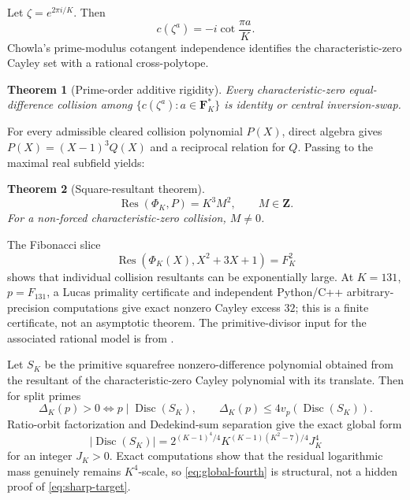 \documentclass[11pt]{article}
\newtheorem{theorem}{Theorem}[section]
\newcommand{\Z}{\mathbf Z}
\newcommand{\Res}{\operatorname{Res}}
\newcommand{\Disc}{\operatorname{Disc}}
\begin{document}
Let $\zeta=e^{2\pi i/K}$.  Then
\[
c(\zeta^a)=-i\cot\frac{\pi a}{K}.
\]
Chowla's prime-modulus cotangent independence \cite{Chowla1970,Wang1982}
identifies the characteristic-zero Cayley set with a rational cross-polytope.

\begin{theorem}[Prime-order additive rigidity]\label{thm:add-rigidity}
Every characteristic-zero equal-difference collision among
$\{c(\zeta^a):a\in\mathbf F_K^*\}$ is identity or central inversion-swap.
\end{theorem}

For every admissible cleared collision polynomial $P(X)$, direct algebra gives
$P(X)=(X-1)^3Q(X)$ and a reciprocal relation for $Q$.  Passing to the maximal
real subfield yields:

\begin{theorem}[Square-resultant theorem]\label{thm:square-res}
\begin{equation}\label{eq:square-res}
\Res(\Phi_K,P)=K^3M^2,\qquad M\in\Z.
\end{equation}
For a non-forced characteristic-zero collision, $M\ne0$.
\end{theorem}

The Fibonacci slice
\[
\Res(\Phi_K(X),X^2+3X+1)=F_K^2
\]
shows that individual collision resultants can be exponentially large.  At
$K=131$, $p=F_{131}$, a Lucas primality certificate and independent Python/C++
arbitrary-precision computations give exact nonzero Cayley excess $32$; this is
a finite certificate, not an asymptotic theorem.  The primitive-divisor input
for the associated rational model is from \cite{Yabuta2001}.

Let $S_K$ be the primitive squarefree nonzero-difference polynomial obtained
from the resultant of the characteristic-zero Cayley polynomial with its
translate.  Then for split primes
\begin{equation}\label{eq:disc-class}
\Delta_K(p)>0\iff p\mid\Disc(S_K),
\qquad
\Delta_K(p)\le4v_p(\Disc(S_K)).
\end{equation}
Ratio-orbit factorization and Dedekind-sum separation \cite{JRW2011} give the
exact global form
\begin{equation}\label{eq:global-fourth}
|\Disc(S_K)|
 =2^{(K-1)^4/4}K^{(K-1)(K^2-7)/4}J_K^4
\end{equation}
for an integer $J_K>0$.  Exact computations show that the residual logarithmic
mass genuinely remains $K^4$-scale, so \eqref{eq:global-fourth} is structural,
not a hidden proof of \eqref{eq:sharp-target}.
\end{document}
